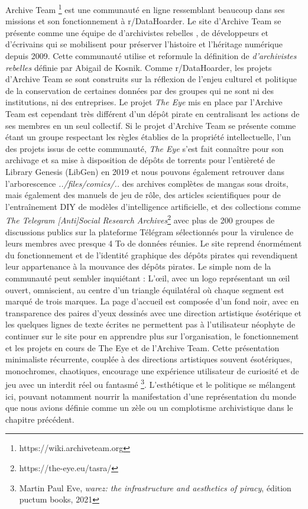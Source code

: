 Archive Team \footnote{https://wiki.archiveteam.org} est une communauté en ligne ressemblant beaucoup dans ses missions et son fonctionnement à r/DataHoarder. Le site d'Archive Team se présente comme une équipe de \og d'archivistes rebelles \fg, de développeurs et d'écrivains qui se mobilisent pour préserver l'histoire et l'héritage numérique depuis 2009. Cette communauté utilise et reformule la définition de \textit{d'archivistes rebelles} définie par Abigail de Kosnik. Comme r/DataHoarder, les projets d'Archive Team se sont construits sur la réflexion de l'enjeu culturel et politique de la conservation de certaines données par des groupes qui ne sont ni des institutions, ni des entreprises. Le projet \textit{The Eye} mis en place par l'Archive Team est cependant très différent d'un dépôt pirate en centralisant les actions de ses membres en un seul collectif. Si le projet d'Archive Team se présente comme étant un groupe respectant les règles établies de la propriété intellectuelle, l'un des projets issus de cette communauté, \textit{The Eye} s'est fait connaître pour son archivage et sa mise à disposition de dépôts de torrents pour l'entièreté de Library Genesis (LibGen) en 2019 et nous pouvons également retrouver dans l'arborescence \textit{../files/comics/..} des archives complètes de mangas sous droits, mais également des manuels de jeu de rôle, des articles scientifiques pour de l'entraînement DIY de modèles d'intelligence artificielle, et des collections comme \textit{The Telegram [Anti]Social Research Archives}\footnote{https://the-eye.eu/tasra/} avec plus de 200 groupes de discussions publics sur la plateforme Télégram sélectionnés pour la virulence de leurs membres avec presque 4 To de données réunies. Le site reprend énormément du fonctionnement et de l'identité graphique des dépôts pirates qui revendiquent leur appartenance à la mouvance des dépôts pirates. Le simple nom de la communauté peut sembler inquiétant : L'œil, avec un logo représentant un œil ouvert, omniscient, au centre d'un triangle équilatéral où chaque segment est marqué de trois marques. La page d'accueil est composée d'un fond noir, avec en transparence des paires d'yeux dessinés avec une direction artistique ésotérique et les quelques lignes de texte écrites ne permettent pas à l'utilisateur néophyte de continuer sur le site pour en apprendre plus sur l'organisation, le fonctionnement et les projets en cours de The Eye et de l'Archive Team. Cette présentation minimaliste récurrente, couplée à des directions artistiques souvent ésotériques, monochromes, chaotiques, encourage une expérience utilisateur de curiosité et de jeu avec un interdit réel ou fantasmé \footnote{Martin Paul Eve, \textit{warez: the infrastructure and aesthetics of piracy}, édition puctum books, 2021}. L'esthétique et le politique se mélangent ici, pouvant notamment nourrir la manifestation d'une représentation du monde que nous avions définie comme un zèle ou un complotisme archivistique dans le chapitre précédent. 


